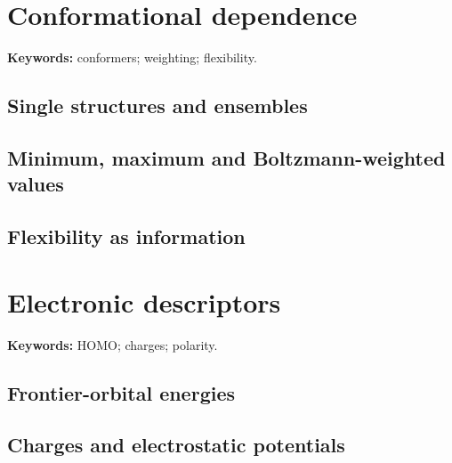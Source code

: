 \section{Conformational dependence}

\begin{warningbox}
\textbf{Keywords:} conformers; weighting; flexibility.
\end{warningbox}

\subsection{Single structures and ensembles}


\subsection{Minimum, maximum and Boltzmann-weighted values}


\subsection{Flexibility as information}


\section{Electronic descriptors}

\begin{methodbox}
\textbf{Keywords:} HOMO; charges; polarity.
\end{methodbox}

\subsection{Frontier-orbital energies}


\subsection{Charges and electrostatic potentials}


